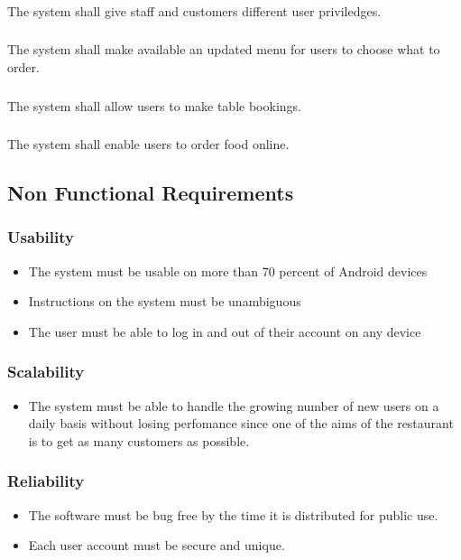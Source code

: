 \documentclass[15, notitlepage]{article}
\begin{document}
\subsubsection{}The system shall give staff and customers different user priviledges.
\subsubsection{}The system shall make available an updated menu for users to choose what to order.
\subsubsection{}The system shall allow users to make table bookings.
\subsubsection{}The system shall enable users to order food online.

\subsection{Non Functional Requirements}
\subsubsection{Usability}
\begin{itemize}
	\item The system must be usable on more than 70 percent of Android devices
	\item Instructions on the system must be unambiguous 
	\item The user must be able to log in and out of their account on any device
\end{itemize}
\subsubsection{Scalability}
\begin{itemize}
	\item The system must be able to handle the growing number of new users on a daily basis without losing perfomance since one of the aims of the restaurant is to get as many customers as possible.
\end{itemize}
\subsubsection{Reliability}
\begin{itemize}
	\item The software must be bug free by the time it is distributed for public use.
	\item Each user account must be secure and unique.
\end{itemize}
\end{document}
